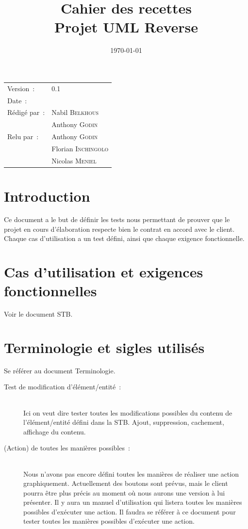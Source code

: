\documentclass[hidelinks, a4paper,11pt,twoside,final]{article}
\title{\bfseries Cahier des recettes\\Projet UML Reverse}
\begin{document}
\maketitle
\begin{center}
\begin{tabular}{ll}
  Version~: & 0.1\\[.5em]
  Date~: & \date{\today}\\[.5em]
  Rédigé par~: & Nabil \textsc{Belkhous}\\
               & Anthony \textsc{Godin}\\[.5em]
  Relu par~:   & Anthony \textsc{Godin}\\
               & Florian \textsc{Inchingolo}\\
               & Nicolas \textsc{Meniel}\\[.5em]
\end{tabular}
\end{center}

\newpage
\tableofcontents

\newpage
\section{Introduction}
  Ce document a le but de définir les tests nous permettant de prouver que le projet en cours d’élaboration respecte bien le contrat
  en accord avec le client.\\
  Chaque cas d’utilisation a un test défini, ainsi que chaque exigence fonctionnelle.

\section{Cas d'utilisation et exigences fonctionnelles}
  Voir le document STB.

\section{Terminologie et sigles utilisés}
  Se référer au document Terminologie.
  \begin{description}
    \item[Test de modification d’élément/entité~:]~\\ Ici on veut dire tester toutes les modifications possibles du contenu de l’élément/entité défini dans la STB.
    Ajout, suppression, cachement, affichage du contenu.
    \item[(Action) de toutes les manières possibles~:]~\\ Nous n’avons pas encore défini toutes les manières de réaliser une action graphiquement.
    Actuellement des boutons sont prévus, mais le client pourra être plus précis au moment où nous aurons une version à lui présenter.
    Il y aura un manuel d’utilisation qui listera toutes les manières possibles d’exécuter une action. Il faudra se référer à ce document pour tester toutes
    les manières possibles d’exécuter une action.
  \end{description}
\end{document}
